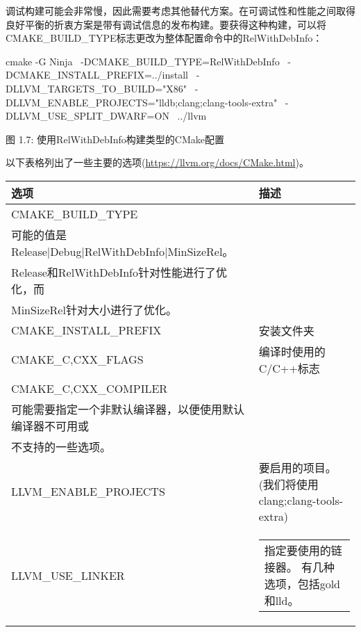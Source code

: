 调试构建可能会非常慢，因此需要考虑其他替代方案。在可调试性和性能之间取得良好平衡的折衷方案是带有调试信息的发布构建。要获得这种构建，可以将CMAKE\_BUILD\_TYPE标志更改为整体配置命令中的RelWithDebInfo：

\begin{shell}
cmake -G Ninja \
  -DCMAKE_BUILD_TYPE=RelWithDebInfo \
  -DCMAKE_INSTALL_PREFIX=../install \
  -DLLVM_TARGETS_TO_BUILD="X86" \
  -DLLVM_ENABLE_PROJECTS="lldb;clang;clang-tools-extra" \
  -DLLVM_USE_SPLIT_DWARF=ON \
  ../llvm
\end{shell}

\begin{center}
图 1.7: 使用RelWithDebInfo构建类型的CMake配置
\end{center}

以下表格列出了一些主要的选项(\url{https://llvm.org/docs/CMake.html})。


\begin{longtable}{|l|l|}
\hline
\textbf{选项}            & \textbf{描述}                                                       \\ \hline
\endfirsthead
%
\endhead
%
CMAKE\_BUILD\_TYPE &
\begin{tabular}[c]{@{}l@{}}指定构建配置。\\ 可能的值是Release|Debug|RelWithDebInfo|MinSizeRel。\\ Release和RelWithDebInfo针对性能进行了优化，而\\MinSizeRel针对大小进行了优化。
\end{tabular} \\ \hline
CMAKE\_INSTALL\_PREFIX & 安装文件夹                                               \\ \hline
CMAKE\_C,CXX\_FLAGS    & 编译时使用的C/C++标志                         \\ \hline
CMAKE\_C,CXX\_COMPILER &
\begin{tabular}[c]{@{}l@{}}用于编译的C/C++编译器。\\ 可能需要指定一个非默认编译器，以便使用默认编译器不可用或\\不支持的一些选项。
\end{tabular} \\ \hline
LLVM\_ENABLE\_PROJECTS & 要启用的项目。(我们将使用clang;clang-tools-extra)
 \\ \hline
LLVM\_USE\_LINKER &
\begin{tabular}[c]{@{}l@{}}指定要使用的链接器。 有几种选项，包括gold和lld。
\end{tabular} \\ \hline
\end{longtable}

